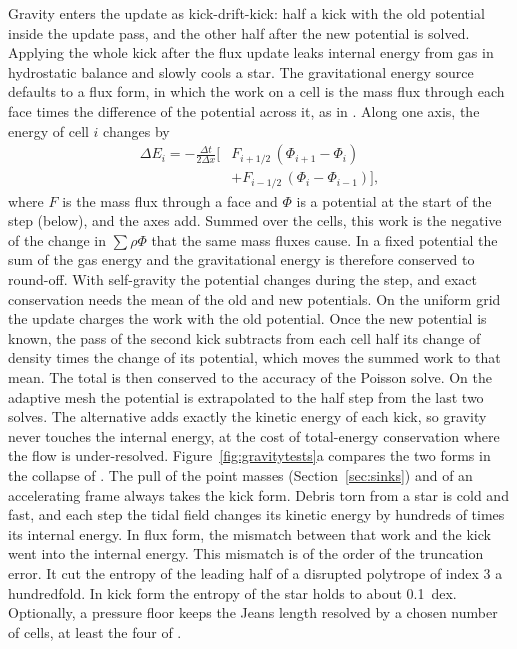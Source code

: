 \documentclass[twocolumn]{aastex701}
\begin{document}
Gravity enters the update as kick-drift-kick: half a kick with the old potential inside the update pass, and the other half after the new potential is solved. Applying the whole kick after the flux update leaks internal energy from gas in hydrostatic balance and slowly cools a star. The gravitational energy source defaults to a flux form, in which the work on a cell is the mass flux through each face times the difference of the potential across it, as in \citet{Springel2010}. Along one axis, the energy of cell $i$ changes by
\begin{equation*}
\begin{aligned}
\Delta E_i = -\frac{\Delta t}{2\Delta x}\bigl[&F_{i+1/2}\,(\Phi_{i+1} - \Phi_i)\\
&+ F_{i-1/2}\,(\Phi_i - \Phi_{i-1})\bigr],
\end{aligned}
\end{equation*}
where $F$ is the mass flux through a face and $\Phi$ is a potential at the start of the step (below), and the axes add. Summed over the cells, this work is the negative of the change in $\sum\rho\Phi$ that the same mass fluxes cause. In a fixed potential the sum of the gas energy and the gravitational energy is therefore conserved to round-off. With self-gravity the potential changes during the step, and exact conservation needs the mean of the old and new potentials. On the uniform grid the update charges the work with the old potential. Once the new potential is known, the pass of the second kick subtracts from each cell half its change of density times the change of its potential, which moves the summed work to that mean. The total is then conserved to the accuracy of the Poisson solve. On the adaptive mesh the potential is extrapolated to the half step from the last two solves. The alternative adds exactly the kinetic energy of each kick, so gravity never touches the internal energy, at the cost of total-energy conservation where the flow is under-resolved. Figure~\ref{fig:gravitytests}a compares the two forms in the collapse of \citet{Evrard1988}. The pull of the point masses (Section~\ref{sec:sinks}) and of an accelerating frame always takes the kick form. Debris torn from a star is cold and fast, and each step the tidal field changes its kinetic energy by hundreds of times its internal energy. In flux form, the mismatch between that work and the kick went into the internal energy. This mismatch is of the order of the truncation error. It cut the entropy of the leading half of a disrupted polytrope of index 3 a hundredfold. In kick form the entropy of the star holds to about 0.1~dex. Optionally, a pressure floor keeps the Jeans length resolved by a chosen number of cells, at least the four of \citet{Truelove1997}.
\end{document}
